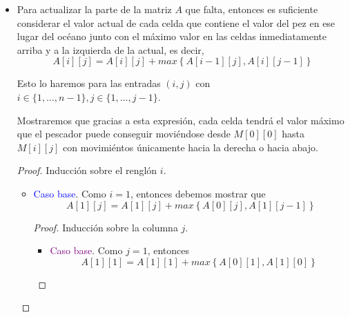 \documentclass[letterpaper,11pt]{article}
\begin{document}
\begin{enumerate}
\begin{itemize}
\begin{proof}
            Por lo tanto, si hacemos que $A[i][0] = A[i-1][0] + A[i][0]$, 
            entonces obtendremos en cada celda de la primer columna el valor 
            máximo que el pescador puede conseguir moviéndose siempre hacia 
            abajo sobre la primer columna.

        \end{proof}

        \item Para actualizar la parte de la matriz $A$ que falta, entonces 
        es suficiente considerar el valor actual de cada celda que contiene
        el valor del pez en ese lugar del océano junto con el máximo valor 
        en las celdas inmediatamente arriba y a la izquierda de la actual, 
        es decir, 
        \begin{equation*}
            A[i][j] = A[i][j] + max\left\{A[i-1][j], A[i][j-1] \right\}
        \end{equation*}

        Esto lo haremos para las entradas $(i,j)$ con  
        $i \in \{1, \ldots, n-1\}, j \in \{1, \ldots, j-1\}$.

        Mostraremos que gracias a esta expresión, cada celda tendrá el 
        valor máximo que el pescador puede conseguir moviéndose desde 
        $M[0][0]$ hasta $M[i][j]$ con movimiéntos únicamente hacia la 
        derecha o hacia abajo.
        \begin{proof}
            Inducción sobre el renglón $i$.
            \begin{itemize}
                \item \textcolor{blue}{Caso base}. Como $i=1$, entonces 
                debemos mostrar que
                \begin{equation*}
                    A[1][j] = 
                    A[1][j] + max\left\{A[0][j], A[1][j-1] \right\}
                \end{equation*}

                \begin{proof}
                    Inducción sobre la columna $j$.
                    \begin{itemize}
                        \item \textcolor{purple}{Caso base}. Como $j=1$, 
                        entonces
                        \begin{equation*}
                            A[1][1] = 
                            A[1][1] + max\left\{A[0][1], A[1][0] \right\}
                        \end{equation*} 


\end{itemize}
\end{proof}
\end{itemize}
\end{proof}
\end{itemize}
\end{enumerate}
\end{document}
